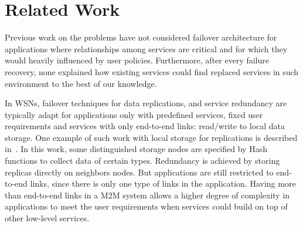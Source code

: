 

\section{Related Work}

Previous work on the problems have not considered failover architecture for
applications where relationships among services are critical and for which they
would heavily influenced by user policies. Furthermore, after every failure
recovery, none explained how existing services could find replaced services in
such environment to the best of our knowledge.

In WSNs, failover techniques for data replications, and service redundancy are
typically adapt for applications only with predefined services, fixed user
requirements and services with only end-to-end links: read/write to local data
storage. One example of such work with local storage for replications is
described in~\cite{Ratnasamy2002}. In this work, some distinguished storage
nodes are specified by Hash functions to collect data of certain types.
Redundancy is achieved by storing replicas directly on neighbors nodes. But
applications are still restricted to end-to-end links, since there is only one
type of links in the application.
Having more than end-to-end links in a M2M system allows a higher degree of
complexity in applications to meet the user requirements when services could
build on top of other low-level services.

